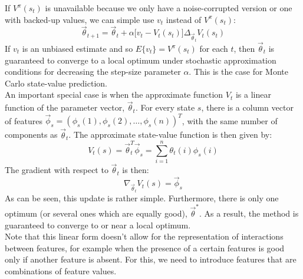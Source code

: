 \documentclass[a4paper]{article}
\begin{document}
If $V^{\pi}(s_t)$ is unavailable because we only have a noise-corrupted version or one with backed-up values, we can simple use $v_t$ instead of $V^{\pi}(s_t)$:
\begin{equation}
\overrightarrow{\theta}_{t+1} = \overrightarrow{\theta}_t + \alpha \big[ v_t - V_t(s_t) \big] \Delta_{\overrightarrow{\theta}_t} V_t(s_t)
\end{equation}
If $v_t$ is an unbiased estimate and so $E\{v_t\} = V^{\pi}(s_t)$ for each $t$, then $\overrightarrow{\theta}_t$ is guaranteed to converge to a local optimum under stochastic approximation conditions for decreasing the step-size parameter $\alpha$. This is the case for Monte Carlo state-value prediction.\\

An important special case is when the approximate function $V_t$ is a linear function of the parameter vector, $\overrightarrow{\theta}_t$. For every state $s$, there is a column vector of features $\overrightarrow{\phi}_s = (\phi_s(1), \phi_s(2), \dots, \phi_s(n))^T$, with the same number of components as $\overrightarrow{\theta}_t$. The approximate state-value function is then given by:
\begin{equation}
V_t(s) = \overrightarrow{\theta}_t^T \overrightarrow{\phi}_s = \sum_{i=1}^n \theta_t(i) \phi_s(i)
\end{equation}
The gradient with respect to $\overrightarrow{\theta}_t$ is then:
\begin{equation}
\nabla_{\overrightarrow{\theta}_t} V_t(s) = \overrightarrow{\phi}_s
\end{equation}
As can be seen, this update is rather simple. Furthermore, there is only one optimum (or several ones which are equally good), $\overrightarrow{\theta}^{*}$. As a result, the method is guaranteed to converge to or near a local optimum.\\
Note that this linear form doesn't allow for the representation of interactions between features, for example when the presence of a certain features is good only if another feature is absent. For this, we need to introduce features that are combinations of feature values.\\
\end{document}
